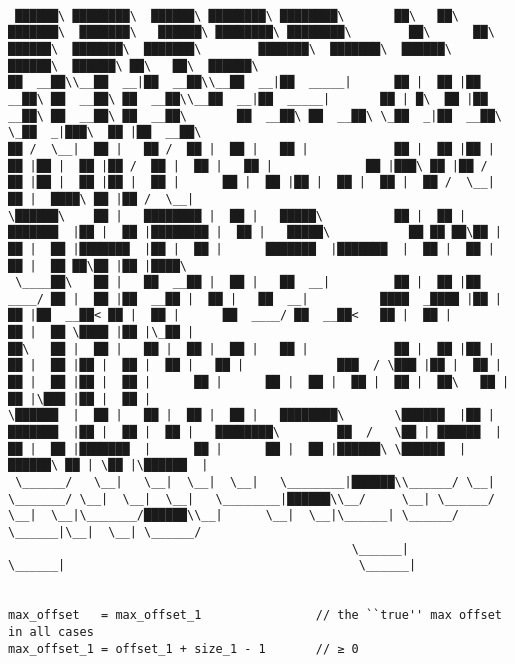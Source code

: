 \documentclass[varwidth=\maxdimen,margin=0.5cm,multi={verbatim}]{standalone}
\begin{document}
\begin{verbatim}

 ██████\ ████████\  ██████\ ████████\ ████████\       ██\   ██\ ███████\  ███████\   ██████\ ████████\ ████████\        ██\      ██\  ██████\  ███████\  ███████\        ███████\  ███████\  ██████\  ██████\  ██████\ ██\   ██\  ██████\
██  __██\\__██  __|██  __██\\__██  __|██  _____|      ██ |  ██ |██  __██\ ██  __██\ ██  __██\\__██  __|██  _____|       ██ | █\  ██ |██  __██\ ██  __██\ ██  __██\       ██  __██\ ██  __██\ \_██  _|██  __██\ \_██  _|███\  ██ |██  __██\
██ /  \__|  ██ |   ██ /  ██ |  ██ |   ██ |            ██ |  ██ |██ |  ██ |██ |  ██ |██ /  ██ |  ██ |   ██ |             ██ |███\ ██ |██ /  ██ |██ |  ██ |██ |  ██ |      ██ |  ██ |██ |  ██ |  ██ |  ██ /  \__|  ██ |  ████\ ██ |██ /  \__|
\██████\    ██ |   ████████ |  ██ |   █████\          ██ |  ██ |███████  |██ |  ██ |████████ |  ██ |   █████\           ██ ██ ██\██ |██ |  ██ |███████  |██ |  ██ |      ███████  |███████  |  ██ |  ██ |        ██ |  ██ ██\██ |██ |████\
 \____██\   ██ |   ██  __██ |  ██ |   ██  __|         ██ |  ██ |██  ____/ ██ |  ██ |██  __██ |  ██ |   ██  __|          ████  _████ |██ |  ██ |██  __██< ██ |  ██ |      ██  ____/ ██  __██<   ██ |  ██ |        ██ |  ██ \████ |██ |\_██ |
██\   ██ |  ██ |   ██ |  ██ |  ██ |   ██ |            ██ |  ██ |██ |      ██ |  ██ |██ |  ██ |  ██ |   ██ |             ███  / \███ |██ |  ██ |██ |  ██ |██ |  ██ |      ██ |      ██ |  ██ |  ██ |  ██ |  ██\   ██ |  ██ |\███ |██ |  ██ |
\██████  |  ██ |   ██ |  ██ |  ██ |   ████████\       \██████  |██ |      ███████  |██ |  ██ |  ██ |   ████████\        ██  /   \██ | ██████  |██ |  ██ |███████  |      ██ |      ██ |  ██ |██████\ \██████  |██████\ ██ | \██ |\██████  |
 \______/   \__|   \__|  \__|  \__|   \________|██████\\______/ \__|      \_______/ \__|  \__|  \__|   \________|██████\\__/     \__| \______/ \__|  \__|\_______/██████\\__|      \__|  \__|\______| \______/ \______|\__|  \__| \______/
                                                \______|                                                         \______|                                         \______|


max_offset   = max_offset_1                // the ``true'' max offset in all cases
max_offset_1 = offset_1 + size_1 - 1       // ≥ 0


\end{verbatim}
\end{document}
